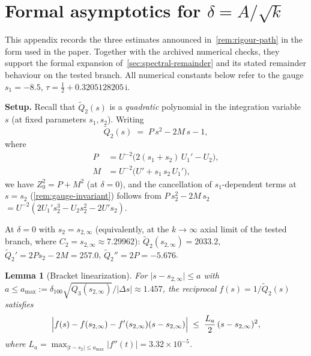 \documentclass[11pt,a4paper]{article}
\theoremstyle{plain}
\newtheorem{lemma}[theorem]{Lemma}
\theoremstyle{definition}
\theoremstyle{remark}
\newcommand{\ii}{\mathrm{i}}
\begin{document}
\section{Formal asymptotics for \texorpdfstring{$\delta = A/\!\sqrt{k}$}{ÃŽÂ´=A/Ã¢Ë†Å¡k}}%
\label{app:rigorous}

This appendix records the three estimates announced
in~\cref{rem:rigour-path} in the form used in the paper.
Together with the archived numerical checks, they support the
formal expansion of~\cref{sec:spectral-remainder} and its
stated remainder behaviour on the tested branch.  All numerical constants
below refer to the gauge $s_1 = -8.5$,
$\tau = \frac12 + 0.3205128205\,\ii$.

\medskip
\noindent\textbf{Setup.}
Recall that $\tilde Q_2(s)$ is a \emph{quadratic} polynomial
in the integration variable~$s$ (at fixed parameters $s_1,s_2$).
Writing
\begin{equation}\label{eq:Qt2-quad}
  \tilde Q_2(s) \;=\; P\,s^2 - 2M\,s - 1,
\end{equation}
where
\begin{align}
  P &= U^{-2}\bigl(2(s_1+s_2)\,U_1' - U_2\bigr),
  \label{eq:P-coeff} \\
  M &= U^{-2}\bigl(U' + s_1\,s_2\,U_1'\bigr),
  \label{eq:M-coeff}
\end{align}
we have $Z_0^2 = P + M^2$ (at $\delta=0$), and
the cancellation of $s_1$-dependent terms at $s = s_2$
(\cref{rem:gauge-invariant}) follows from
$P\,s_2^2 - 2M\,s_2$
$= U^{-2}(2U_1' s_2^3 - U_2 s_2^2 - 2U' s_2)$.

\smallskip
At $\delta = 0$ with $s_2 = s_{2,\infty}$ (equivalently, at the
$k\to\infty$ axial limit of the tested branch, where $C_2 =
s_{2,\infty}\approx 7.29962$):
$\tilde Q_2(s_{2,\infty}) = 2033.2$, \;
$\tilde Q_2' = 2Ps_2 - 2M = 257.0$, \;
$\tilde Q_2'' = 2P = -5.676$.

\begin{lemma}[Bracket linearization]\label{lem:bracket}
  For $\lvert s - s_{2,\infty}\rvert \le a$
  with $a \le a_{\max} := \delta_{\!100}\sqrt{Q_3(s_{2,\infty})}/\lvert\Delta s\rvert
  \approx 1.457$,
  the reciprocal $f(s) = 1/\tilde Q_2(s)$ satisfies
  \[
    \Bigl\lvert f(s) - f(s_{2,\infty})
      - f'(s_{2,\infty})(s - s_{2,\infty})\Bigr\rvert
    \;\le\; \frac{L_a}{2}\,(s - s_{2,\infty})^2,
  \]
  where $L_a = \max_{\lvert t - s_{2}\rvert \le a_{\max}}
  \lvert f''(t)\rvert = 3.32 \times 10^{-5}$.
\end{lemma}
\end{document}
